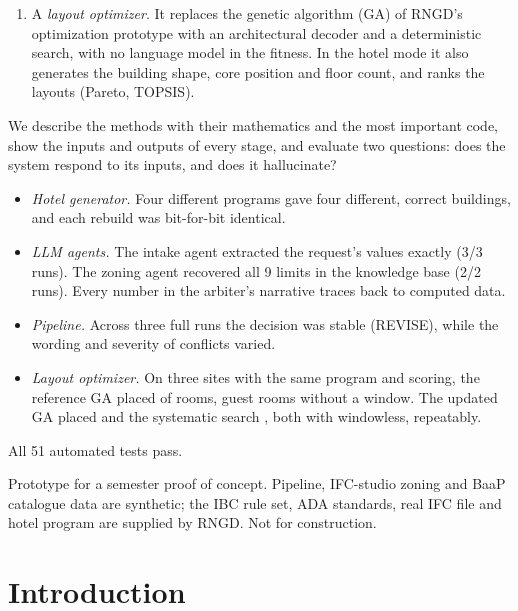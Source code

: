 \documentclass[10pt,a4paper]{article}
\theoremstyle{definition}
\begin{document}
\begin{titlepage}
\begin{minipage}{0.86\linewidth}
\begin{enumerate}
against the IBC rules and the 2010 ADA guest-room tables, and draws an 18\,$\times$\,12\,in drawing set in RNGD's
sheet format.
\item A \emph{layout optimizer}. It replaces the genetic algorithm (GA) of RNGD's optimization prototype with an
architectural decoder and a deterministic search, with no language model in the fitness. In the hotel mode it also
generates the building shape, core position and floor count, and ranks the layouts (Pareto, TOPSIS).
\end{enumerate}
We describe the methods with their mathematics and the most important code, show the inputs and outputs of every stage,
and evaluate two questions: does the system respond to its inputs, and does it hallucinate?
\begin{itemize}
\item \emph{Hotel generator.} Four different programs gave four different, correct buildings, and each rebuild was
bit-for-bit identical.
\item \emph{LLM agents.} The intake agent extracted the request's values exactly (3/3 runs). The zoning agent recovered
all 9 limits in the knowledge base (2/2 runs). Every number in the arbiter's narrative traces back to computed data.
\item \emph{Pipeline.} Across three full runs the decision was stable (REVISE), while the wording and severity of
conflicts varied.
\item \emph{Layout optimizer.} On three sites with the same program and scoring, the reference GA placed
\optRoomsA{} of \optRoomsTotal{} rooms, \optNoWinA{} guest rooms without a window. The updated GA placed
\optRoomsC{} and the systematic search \optRoomsD{}, both with \optNoWinD{} windowless, repeatably.
\end{itemize}
All 51 automated tests pass.
\end{minipage}
\vfill
{\small\color{failc} Prototype for a semester proof of concept. Pipeline, IFC-studio zoning and BaaP catalogue data are
synthetic; the IBC rule set, ADA standards, real IFC file and hotel program are supplied by RNGD. Not for construction.}
\end{titlepage}

\tableofcontents
\clearpage

\section{Introduction}
\label{sec:intro}
\end{document}
